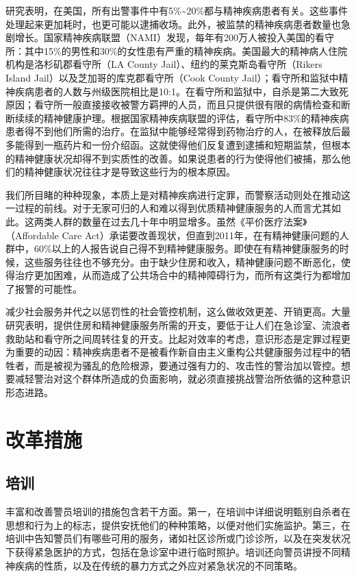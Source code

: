 \documentclass[fontset=fandol, a4paper, 12pt, openright]{ctexbook}
\begin{document}
研究表明，在美国，所有出警事件中有5\%\textasciitilde20\%都与精神疾病患者有关。这些事件处理起来更加耗时，也更可能以逮捕收场。此外，被监禁的精神疾病患者数量也急剧增长。国家精神疾病联盟（NAMI）发现，每年有200万人被投入美国的看守所：其中15\%的男性和30\%的女性患有严重的精神疾病。美国最大的精神病人住院机构是洛杉矶郡看守所（LA County Jail）、纽约的莱克斯岛看守所（Rikers Island Jail）以及芝加哥的库克郡看守所（Cook County Jail）；看守所和监狱中精神疾病患者的人数与州级医院相比是10:1。在看守所和监狱中，自杀是第二大致死原因；看守所一般直接接收被警方羁押的人员，而且只提供很有限的病情检查和断断续续的精神健康护理。根据国家精神疾病联盟的评估，看守所中83\%的精神疾病患者得不到他们所需的治疗。在监狱中能够经常得到药物治疗的人，在被释放后最多能得到一瓶药片和一份介绍函。这就使得他们反复遭到逮捕和短期监禁，但根本的精神健康状况却得不到实质性的改善。如果说患者的行为使得他们被捕，那么他们的精神健康状况往往才是导致这些行为的根本原因。

我们所目睹的种种现象，本质上是对精神疾病进行定罪，而警察活动则处在推动这一过程的前线。对于无家可归的人和难以得到优质精神健康服务的人而言尤其如此。这两类人群的数量在过去几十年中明显增多。虽然《平价医疗法案》（Affordable Care Act）承诺要改善现状，但直到2011年，在有精神健康问题的人群中，60\%以上的人报告说自己得不到精神健康服务。即使在有精神健康服务的时候，这些服务往往也不够充分。由于缺少住房和收入，精神健康问题不断恶化，使得治疗更加困难，从而造成了公共场合中的精神障碍行为，而所有这类行为都增加了报警的可能性。

减少社会服务并代之以惩罚性的社会管控机制，这么做收效更差、开销更高。大量研究表明，提供住房和精神健康服务所需的开支，要低于让人们在急诊室、流浪者救助站和看守所之间周转往复的开支。比起对效率的考虑，意识形态是定罪过程更为重要的动因：精神疾病患者不是被看作新自由主义重构公共健康服务过程中的牺牲者，而是被视为骚乱的危险根源，要通过强有力的、攻击性的警治加以管控。想要减轻警治对这个群体所造成的负面影响，就必须直接挑战警治所依循的这种意识形态进路。

\section{改革措施}

\subsection{培训}
丰富和改善警员培训的措施包含若干方面。第一，在培训中详细说明甄别自杀者在思想和行为上的标志，提供安抚他们的种种策略，以便对他们实施监护。第三，在培训中告知警员们有哪些可用的服务，诸如社区诊所或门诊诊所，以及在突发状况下获得紧急医护的方式，包括在急诊室中进行临时照护。培训还向警员讲授不同精神疾病的性质，以及在传统的暴力方式之外应对紧急状况的不同策略。
\end{document}
